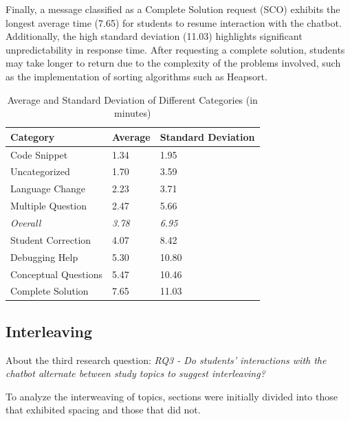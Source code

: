 \documentclass[a4paper,twoside]{article}
\begin{document}
Finally, a message classified as a Complete Solution request (SCO) exhibits the
longest average time (7.65) for students to resume interaction with the chatbot.
Additionally, the high standard deviation (11.03) highlights significant
unpredictability in response time. After requesting a complete solution,
students may take longer to return due to the complexity of the problems
involved, such as the implementation of sorting algorithms such as Heapsort.

\begin{table}[htbp]
  \caption{Average and Standard Deviation of Different Categories (in minutes)}
  \begin{center}
    \renewcommand{\arraystretch}{1.2} %
    \begin{tabular}{p{4cm} p{3cm} p{3cm}} %
      \hline
      \textbf{Category} & \textbf{Average} & \textbf{Standard Deviation} \\
      \hline
      Code Snippet & 1.34 & 1.95 \\
      Uncategorized & 1.70 & 3.59 \\
      Language Change & 2.23 & 3.71 \\
      Multiple Question & 2.47 & 5.66 \\
      \hdashline
      \textit{Overall} & \textit{3.78} & \textit{6.95} \\
      \hdashline
      Student Correction & 4.07 & 8.42 \\
      Debugging Help & 5.30 & 10.80 \\
      Conceptual Questions & 5.47 & 10.46 \\
      Complete Solution & 7.65 & 11.03 \\
      \hline
    \end{tabular}
    \label{tab:averages}
  \end{center}
\end{table}

\subsection{Interleaving}

About the third research question: \textit{RQ3 - Do students' interactions with
the chatbot alternate between study topics to suggest interleaving?}

To analyze the interweaving of topics, sections were initially divided into
those that exhibited spacing and those that did not.
\end{document}
